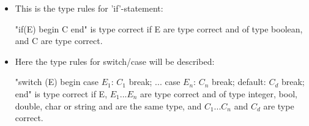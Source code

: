 \begin{itemize}
\item This is the type rules for 'if'-statement:

"if(E) begin C end" is type correct if E are type correct and of type boolean, and C are type correct.

\item Here the type rules for switch/case will be described:

"switch (E) begin case $E_1$: $C_1$ break; ... case $E_n$: $C_n$ break; default: $C_d$ break; end" is type correct if E, $E_1$...$E_n$ are type correct and of type integer, bool, double, char or string and are the same type, and $C_1$...$C_n$ and $C_d$ are type correct.
\end{itemize}